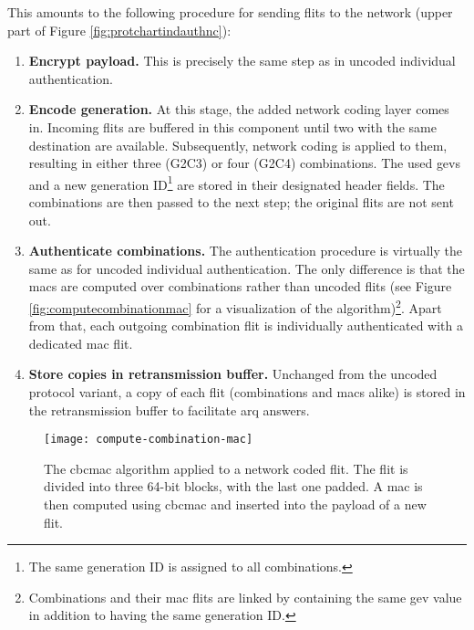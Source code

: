 This amounts to the following procedure for sending flits to the network (upper part of Figure \ref{fig:protchartindauthnc}):
\begin{enumerate}
    \item \textbf{Encrypt payload.} This is precisely the same step as in uncoded individual authentication.
    \item \textbf{Encode generation.} At this stage, the added network coding layer comes in. Incoming flits are buffered in this component until two
        with the same destination are available. Subsequently, network coding is applied to them, resulting in either three (G2C3) or four (G2C4)
        combinations. The used \glspl{gev} and a new generation ID\footnote{The same generation ID is assigned to all combinations.} are stored in
        their designated header fields. The combinations are then passed to the next step; the original flits are not sent out.
    \item \textbf{Authenticate combinations.} The authentication procedure is virtually the same as for uncoded individual authentication. The only
        difference is that the \glspl{mac} are computed over combinations rather than uncoded flits (see Figure \vref{fig:computecombinationmac}
        for a visualization of the algorithm)\footnote{Combinations and their \gls{mac} flits are linked by containing the same \gls{gev} value in
        addition to having the same generation ID.}. Apart from that, each outgoing combination flit is individually authenticated with a dedicated \gls{mac}
        flit.
    \item \textbf{Store copies in retransmission buffer.} Unchanged from the uncoded protocol variant, a copy of each flit (combinations and
        \glspl{mac} alike) is stored in the retransmission buffer to facilitate \gls{arq} answers.
\end{enumerate}
\vspace{0.5\baselineskip}

\begin{figure}
    \centering
    \texttt{[image: compute-combination-mac]}
    \caption[CBC-MAC algorithm applied to a network coded flit]{The \gls{cbcmac} algorithm applied to a network coded flit. The flit is divided into three
    64-bit blocks, with the last one padded. A \gls{mac} is then computed using \gls{cbcmac} and inserted into the payload of a new flit.}
    \label{fig:computecombinationmac}
\end{figure}

